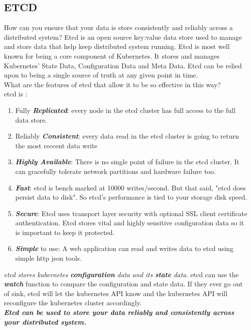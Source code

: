 \documentclass{article}
\begin{document}
\subsection{ETCD}
How can you ensure that your data is store consistently and reliably across a distributed system? Etcd is an open source key:value data store used to manage and store data that help keep distributed system running. Etcd is most well known for being a core component of Kubernetes. It stores and manages Kubernetes' State Data, Configuration Data and Meta Data. Etcd can be relied upon to being a single source of truth at any given point in time.  \\
What are the features of etcd that allow it to be so effective in this way? \\
etcd is :
\begin{enumerate}
    \item Fully \textbf{\textit{Replicated}}: every node in the etcd cluster has full access to the full data store.
    \item Reliably \textbf{\textit{Consistent}}: every data read in the etcd cluster is going to return the most reccent data write
    \item \textbf{\textit{Highly Available}}: There is no single point of failure in the etcd cluster. It can gracefully tolerate network partitions and hardware failure too. 
    \item \textbf{\textit{Fast}}: etcd is bench marked at 10000 writes/second. But that said, "etcd does persist data to disk". So etcd's performance is tied to your storage disk speed. 
    \item \textbf{\textit{Secure}}: Etcd uses transport layer security with optional SSL client certificate authentication.  Etcd stores vital and highly sensitive configuration data so it is important to keep it protected. 
    \item \textbf{\textit{Simple}} to use: A web application can read and writes data to etcd using simple http json tools. 
\end{enumerate}
\textit{etcd stores kubernetes \textbf{configuration} data and its \textbf{state} data}. etcd can use the \textbf{\textit{watch}} function to compare the configuration and state data. If they ever go out of sink, etcd will let the kubernetes API know and the kubernetes API will reconfigure the kubernetes cluster accordingly. \\
\textbf{\textit{Etcd can be used to store your data reliably and consistently across your distributed system. }}\\
\end{document}
